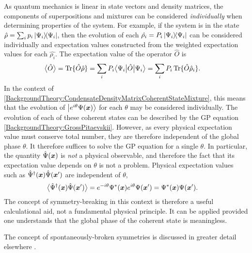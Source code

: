 As quantum mechanics is linear in state vectors and density matrices, the components of superpositions and mixtures can be considered \emph{individually} when determining properties of the system.  For example, if the system is in the state $\hat{\rho} = \sum_i p_i \left|\Psi_i\middle>\!\middle<\Psi_i\right|$, then the evolution of each $\hat{\rho_i} = P_i \left|\Psi_i\middle>\!\middle<\Psi_i\right|$ can be considered individually and expectation values constructed from the weighted expectation values for each $\hat{\rho_i}$.  The expectation value of the operator $\hat{O}$ is
\begin{align*}
    {\ensuremath{\big<\hat{O}\big>}} &= \operatorname{Tr}\{ \hat{O} \hat{\rho}  \} = \sum_i P_i \big< \Psi_i \big| \hat{O} \big| \Psi_i \big> = \sum_i P_i \operatorname{Tr}\{ \hat{O} \hat{\rho}_i  \}.
\end{align*}
In the context of \eqref{BackgroundTheory:CondensateDensityMatrixCoherentStateMixture}, this means that the evolution of ${\left|e^{i \theta}\Psi(\bm{x})\right>}$ for each $\theta$ may be considered individually.  The evolution of each of these coherent states can be described by the GP equation \eqref{BackgroundTheory:GrossPitaevskii}.  However, as every physical expectation value must conserve total number, they are therefore independent of the global phase $\theta$.  It therefore suffices to solve the GP equation for a single $\theta$.  In particular, the quantity $\hat{\Psi}(\bm{x})$ is \emph{not} a physical observable, and therefore the fact that its expectation value depends on $\theta$ is not a problem.  Physical expectation values such as $\hat{\Psi}^\dagger(\bm{x}) \hat{\Psi}(\bm{x}')$ are independent of $\theta$,
\begin{align}
    {\ensuremath{\big<\hat{\Psi}^\dagger(\bm{x}) \hat{\Psi}(\bm{x}')\big>}} &= e^{-i\theta}\Psi^*(\bm{x}) e^{i\theta}\Psi(\bm{x}') = \Psi^*(\bm{x}) \Psi(\bm{x}').
\end{align}
The concept of symmetry-breaking in this context is therefore a useful calculational aid, not a fundamental physical principle.    It can be applied provided one understands that the global phase of the coherent state is meaningless.

The concept of spontaneously-broken symmetries is discussed in greater detail elsewhere \citep{Leggett:1991fj,Molmer:1997fr}.  %

